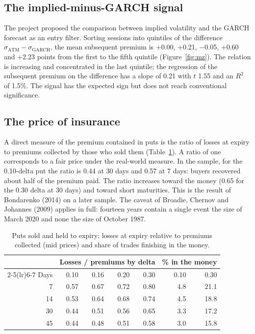 \documentclass[11pt,a4paper]{article}
\begin{document}
\subsection{The implied-minus-GARCH signal}

The project proposed the comparison between implied volatility and the GARCH forecast as an entry filter. Sorting sessions into quintiles of the difference $\sigma_{\mathrm{ATM}}-\sigma_{\mathrm{GARCH}}$, the mean subsequent premium is +0.00, +0.21, $-$0.05, +0.60 and +2.23 points from the first to the fifth quintile (Figure~\ref{fig:mz}). The relation is increasing and concentrated in the last quintile; the regression of the subsequent premium on the difference has a slope of 0.21 with $t$ 1.55 and an $R^2$ of 1.5\%. The signal has the expected sign but does not reach conventional significance.

\subsection{The price of insurance}

A direct measure of the premium contained in puts is the ratio of losses at expiry to premiums collected by those who sold them (Table~\ref{tab:ins}). A ratio of one corresponds to a fair price under the real-world measure. In the sample, for the 0.10-delta put the ratio is 0.44 at 30 days and 0.57 at 7 days: buyers recovered about half of the premium paid. The ratio increases toward the money (0.65 for the 0.30 delta at 30 days) and toward short maturities. This is the result of Bondarenko (2014) on a later sample. The caveat of Broadie, Chernov and Johannes (2009) applies in full: fourteen years contain a single event the size of March 2020 and none the size of October 1987.

\begin{table}[ht]\centering\small
\caption{Puts sold and held to expiry: losses at expiry relative to premiums collected (mid prices) and share of trades finishing in the money.}\label{tab:ins}
\begin{tabular}{rrrrrrr}\toprule
 & \multicolumn{4}{c}{Losses / premiums by delta} & \multicolumn{2}{c}{\% in the money} \\ \cmidrule(lr){2-5}\cmidrule(lr){6-7}
Days & 0.10 & 0.16 & 0.20 & 0.30 & 0.10 & 0.30 \\ \midrule
7 & 0.57 & 0.67 & 0.72 & 0.80 & 4.8 & 21.1 \\
14 & 0.53 & 0.64 & 0.68 & 0.74 & 4.5 & 18.8 \\
30 & 0.44 & 0.51 & 0.56 & 0.65 & 3.3 & 17.2 \\
45 & 0.44 & 0.48 & 0.51 & 0.58 & 3.0 & 15.8 \\
\bottomrule\end{tabular}\end{table}
\end{document}
